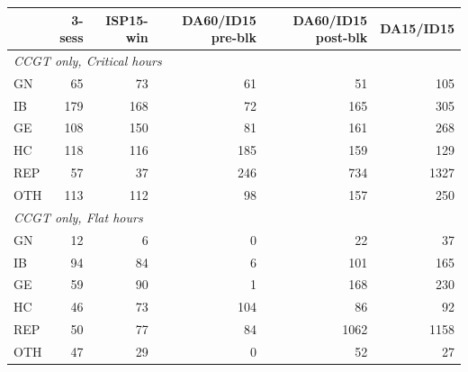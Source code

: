 \begin{tabular}{l r r r r r}
\toprule
 & 3-sess & ISP15-win & DA60/ID15 pre-blk & DA60/ID15 post-blk & DA15/ID15 \\
\midrule
\multicolumn{6}{l}{\textit{CCGT only, Critical hours}} \\
GN & 65 & 73 & 61 & 51 & 105 \\
IB & 179 & 168 & 72 & 165 & 305 \\
GE & 108 & 150 & 81 & 161 & 268 \\
HC & 118 & 116 & 185 & 159 & 129 \\
REP & 57 & 37 & 246 & 734 & 1327 \\
OTH & 113 & 112 & 98 & 157 & 250 \\
\midrule
\multicolumn{6}{l}{\textit{CCGT only, Flat hours}} \\
GN & 12 & 6 & 0 & 22 & 37 \\
IB & 94 & 84 & 6 & 101 & 165 \\
GE & 59 & 90 & 1 & 168 & 230 \\
HC & 46 & 73 & 104 & 86 & 92 \\
REP & 50 & 77 & 84 & 1062 & 1158 \\
OTH & 47 & 29 & 0 & 52 & 27 \\
\midrule
\bottomrule
\end{tabular}
